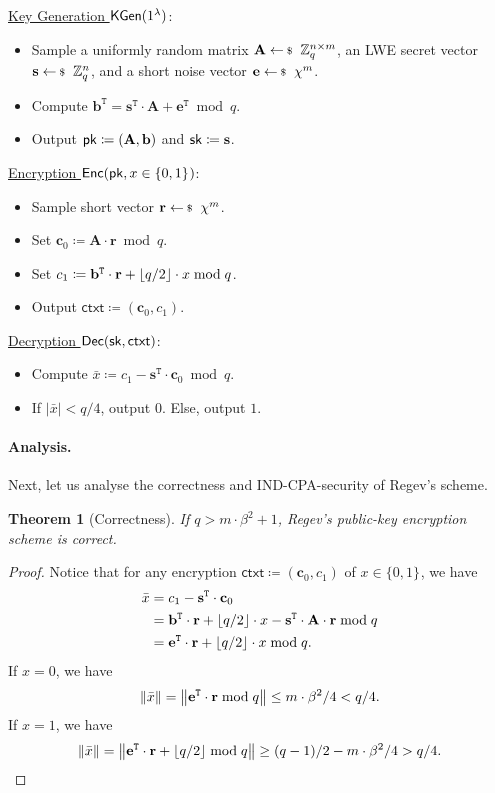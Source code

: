 \documentclass[10pt,twoside]{article}
\newcounter{lecnum}
\newtheorem{theorem}{Theorem}[lecnum]
\newcommand{\ctxt}{\mathsf{ctxt}}
\newcommand{\bits}[1][]{\{0,1\}^{#1}}
\renewcommand{\vec}[1]{\mathbf{#1}}
\newcommand{\mat}[1]{\mathbf{#1}}
\newcommand{\transpose}{\mathtt{T}}
\begin{document}
\noindent\underline{Key Generation $\mathsf{KGen}(1^{\lambda})$}:
\begin{itemize}
    \item Sample a uniformly random matrix $\mat{A} \sample \ZZ_q^{n \times m}$,
    an LWE secret vector $\vec{s} \sample \ZZ_q^n$,
    and a short noise vector $\vec{e} \sample \chi^{m}$.
    \item Compute $\vec{b}^\transpose = \vec{s}^\transpose \cdot \mat{A} + \vec{e}^\transpose \bmod q$.
    \item Output $\pk \coloneqq (\mat{A}, \vec{b})$ and $\sk \coloneqq \vec{s}$.
\end{itemize}

\noindent\underline{Encryption $\enc(\pk, x \in \bits)$}:
\begin{itemize}
    \item Sample short vector $\vec{r} \sample \chi^{m}$.
    \item Set $\vec{c}_0 \coloneqq \mat{A} \cdot \vec{r} \bmod q$.
    \item Set $c_1 \coloneqq \vec{b}^\transpose \cdot \vec{r} + \floor{q/2} \cdot x \bmod q$.
    \item Output $\ctxt \coloneqq (\vec{c}_0, c_1)$.
\end{itemize}

\noindent\underline{Decryption $\dec(\sk, \ctxt)$}:
\begin{itemize}
    \item Compute $\bar{x} \coloneqq c_1 -\vec{s}^\transpose \cdot \vec{c}_0 \bmod q$.
\item If $|\bar{x}| < q/4$, output $0$. Else, output $1$.
\end{itemize}

\paragraph*{Analysis.}

Next, let us analyse the correctness and IND-CPA-security of Regev's scheme.

\begin{theorem}[Correctness]
    If $q > m \cdot \beta^2 + 1$, Regev's public-key encryption scheme is correct.
\end{theorem}

\begin{proof}
    Notice that for any encryption $\ctxt \coloneqq (\vec{c}_0, c_1)$ of $x \in \bits$, we have
    \begin{align*}
        \bar{x}
        &= c_1 - \vec{s}^\transpose \cdot \vec{c}_0 \\
        &= \vec{b}^\transpose \cdot \vec{r} + \floor{q/2} \cdot x - \vec{s}^\transpose \cdot \mat{A} \cdot \vec{r} \bmod q \\
        &= \vec{e}^\transpose \cdot \vec{r} + \floor{q/2} \cdot x \bmod q.
    \end{align*}
    If $x = 0$, we have \[\norm{\bar{x}} = \norm{\vec{e}^\transpose \cdot \vec{r} \bmod q} \leq m \cdot \beta^2 / 4 < q/4.\]
    If $x = 1$, we have \[\norm{\bar{x}} = \norm{\vec{e}^\transpose \cdot \vec{r} + \floor{q/2} \bmod q} \geq (q-1)/2 - m \cdot \beta^2 / 4 > q/4.\]
\end{proof}
\end{document}
